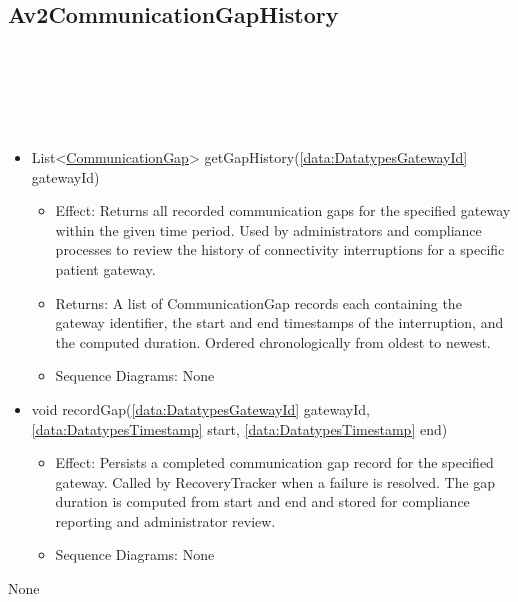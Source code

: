   \subsection{Av2CommunicationGapHistory}\label{int:InterfacesAv2CommunicationGapHistory}
    \begin{description}
      \item[Provided by:] \iconcomponent{}~
      \item[Required by:] \iconcomponent{}~ 
      \item[Operations:] ~
    \begin{itemize}[noitemsep,nolistsep,leftmargin=-.25cm]
      \item \textsf{List\textless{}{\colorbox{red!30}{\underline{CommunicationGap}}}\textgreater{} getGapHistory(\ref{data:DatatypesGatewayId} gatewayId)}
        \begin{itemize}[noitemsep,nolistsep]
           \item Effect: Returns all recorded communication gaps for the specified gateway within the given time period. Used by administrators and compliance processes to review the history of connectivity interruptions for a specific patient gateway. 
           \item Returns: A list of CommunicationGap records each containing the gateway identifier, the start and end timestamps of the interruption, and the computed duration. Ordered chronologically from oldest to newest.
           \item Sequence Diagrams: None
        \end{itemize}
      \item \textsf{void recordGap(\ref{data:DatatypesGatewayId} gatewayId, \ref{data:DatatypesTimestamp} start, \ref{data:DatatypesTimestamp} end)}
        \begin{itemize}[noitemsep,nolistsep]
           \item Effect: Persists a completed communication gap record for the specified gateway. Called by RecoveryTracker when a failure is resolved. The gap duration is computed from start and end and stored for compliance reporting and administrator review. 
           \item Sequence Diagrams: None
        \end{itemize}
    \end{itemize}
      \item[Diagrams:] None
    \end{description}

